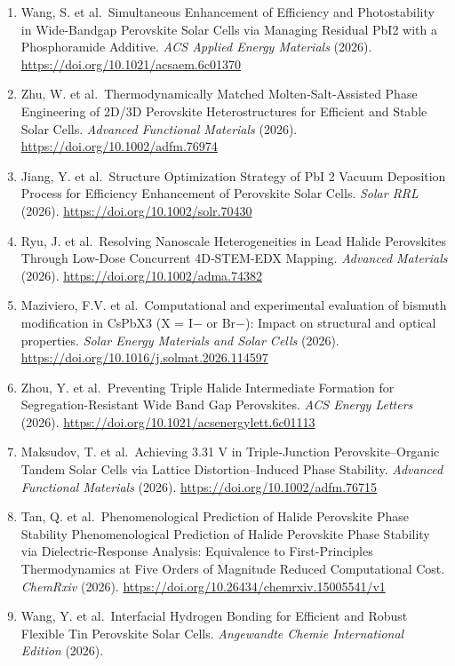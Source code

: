\documentclass[
  11pt,
]{article}
\begin{document}
\begin{enumerate}
\item
  Wang, S. et al.~Simultaneous Enhancement of Efficiency and
  Photostability in Wide-Bandgap Perovskite Solar Cells via Managing
  Residual PbI2 with a Phosphoramide Additive. \emph{ACS Applied Energy
  Materials} (2026). \url{https://doi.org/10.1021/acsaem.6c01370}
\item
  Zhu, W. et al.~Thermodynamically Matched Molten‐Salt‐Assisted Phase
  Engineering of 2D/3D Perovskite Heterostructures for Efficient and
  Stable Solar Cells. \emph{Advanced Functional Materials} (2026).
  \url{https://doi.org/10.1002/adfm.76974}
\item
  Jiang, Y. et al.~Structure Optimization Strategy of PbI 2 Vacuum
  Deposition Process for Efficiency Enhancement of Perovskite Solar
  Cells. \emph{Solar RRL} (2026).
  \url{https://doi.org/10.1002/solr.70430}
\item
  Ryu, J. et al.~Resolving Nanoscale Heterogeneities in Lead Halide
  Perovskites Through Low‐Dose Concurrent 4D‐STEM‐EDX Mapping.
  \emph{Advanced Materials} (2026).
  \url{https://doi.org/10.1002/adma.74382}
\item
  Maziviero, F.V. et al.~Computational and experimental evaluation of
  bismuth modification in CsPbX3 (X = I− or Br−): Impact on structural
  and optical properties. \emph{Solar Energy Materials and Solar Cells}
  (2026). \url{https://doi.org/10.1016/j.solmat.2026.114597}
\item
  Zhou, Y. et al.~Preventing Triple Halide Intermediate Formation for
  Segregation-Resistant Wide Band Gap Perovskites. \emph{ACS Energy
  Letters} (2026). \url{https://doi.org/10.1021/acsenergylett.6c01113}
\item
  Maksudov, T. et al.~Achieving 3.31 V in Triple‐Junction
  Perovskite--Organic Tandem Solar Cells via Lattice Distortion--Induced
  Phase Stability. \emph{Advanced Functional Materials} (2026).
  \url{https://doi.org/10.1002/adfm.76715}
\item
  Tan, Q. et al.~Phenomenological Prediction of Halide Perovskite Phase
  Stability Phenomenological Prediction of Halide Perovskite Phase
  Stability via Dielectric-Response Analysis: Equivalence to
  First-Principles Thermodynamics at Five Orders of Magnitude Reduced
  Computational Cost. \emph{ChemRxiv} (2026).
  \url{https://doi.org/10.26434/chemrxiv.15005541/v1}
\item
  Wang, Y. et al.~Interfacial Hydrogen Bonding for Efficient and Robust
  Flexible Tin Perovskite Solar Cells. \emph{Angewandte Chemie
  International Edition} (2026).

\end{enumerate}
\end{document}
